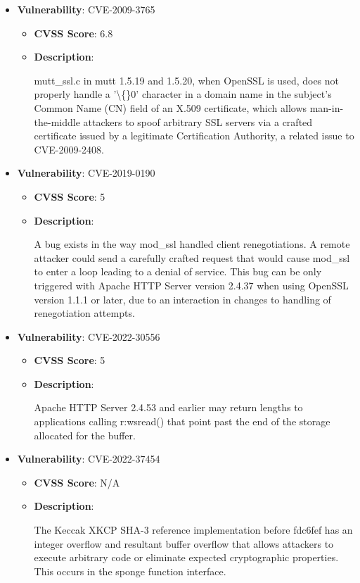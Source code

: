 \documentclass{article}
\begin{document}
\begin{itemize}
        \item \textbf{Vulnerability}: CVE-2009-3765
        \begin{itemize}
            \item \textbf{CVSS Score}:  6.8 
            \item \textbf{Description}:
            \parbox[t]{0.9\linewidth}{
                \ttfamily mutt\_ssl.c in mutt 1.5.19 and 1.5.20, when OpenSSL is used, does not properly handle a '\textbackslash\{\}0' character in a domain name in the subject's Common Name (CN) field of an X.509 certificate, which allows man-in-the-middle attackers to spoof arbitrary SSL servers via a crafted certificate issued by a legitimate Certification Authority, a related issue to CVE-2009-2408.
            }
        \end{itemize}
    
        \item \textbf{Vulnerability}: CVE-2019-0190
        \begin{itemize}
            \item \textbf{CVSS Score}:  5 
            \item \textbf{Description}:
            \parbox[t]{0.9\linewidth}{
                \ttfamily A bug exists in the way mod\_ssl handled client renegotiations. A remote attacker could send a carefully crafted request that would cause mod\_ssl to enter a loop leading to a denial of service. This bug can be only triggered with Apache HTTP Server version 2.4.37 when using OpenSSL version 1.1.1 or later, due to an interaction in changes to handling of renegotiation attempts.
            }
        \end{itemize}
    
        \item \textbf{Vulnerability}: CVE-2022-30556
        \begin{itemize}
            \item \textbf{CVSS Score}:  5 
            \item \textbf{Description}:
            \parbox[t]{0.9\linewidth}{
                \ttfamily Apache HTTP Server 2.4.53 and earlier may return lengths to applications calling r:wsread() that point past the end of the storage allocated for the buffer.
            }
        \end{itemize}
    
        \item \textbf{Vulnerability}: CVE-2022-37454
        \begin{itemize}
            \item \textbf{CVSS Score}:  N/A 
            \item \textbf{Description}:
            \parbox[t]{0.9\linewidth}{
                \ttfamily The Keccak XKCP SHA-3 reference implementation before fdc6fef has an integer overflow and resultant buffer overflow that allows attackers to execute arbitrary code or eliminate expected cryptographic properties. This occurs in the sponge function interface.
            }
        \end{itemize}
    

\end{itemize}
\end{document}
